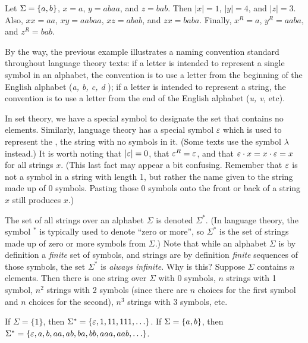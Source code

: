 \begin{example}Let $\Sigma = \mbox{$\{a,b\}$}$, $x=a$, $y=abaa$, and $z=bab$.
Then $|x| = 1$, $|y| = 4$, and $|z|=3$.  Also, $xx = aa$, $xy =
aabaa$, $xz = abab$, and $zx = baba$.  Finally, $x^R = a$,
$y^R = aaba$, and $z^R=bab$.
\end{example}

\smallskip

By the way, the previous example illustrates a naming convention standard
throughout language theory texts: if a letter is
intended to represent a single symbol in an alphabet, the convention
is to use a letter from the beginning of the English alphabet ({\em a,
b, c, d }); if a letter is intended to represent a string, the 
convention is to use a letter from the end of the English alphabet
({\em u, v, } etc).

\bigskip

In set theory, we have a special symbol to designate the set that 
contains no elements.  Similarly, language theory has a special 
symbol $\varepsilon$ which is used to represent the , the
string with no 
symbols in it.  (Some texts use the symbol $\lambda$ instead.)
It is worth noting that $|\varepsilon| = 0$, that $\varepsilon^R = \varepsilon$,
and that $\varepsilon \cdot x = x \cdot \varepsilon = x$ for all strings $x$.
(This last fact may appear a bit confusing.  Remember that $\varepsilon$
is not a symbol in a string with length 1, but rather the name given
to the string made up of 0 symbols.  Pasting those 0 symbols onto the
front or back of a string $x$ still produces $x$.) 

\bigskip

The set of all strings over an alphabet $\Sigma$ is denoted $\Sigma^*$.
(In language theory, the symbol $^*$ is typically used to denote ``zero
or more'', so $\Sigma^*$ is the set of strings made up of zero or 
more symbols from $\Sigma$.)  Note that while an alphabet 
$\Sigma$ is by 
definition a \emph{finite} set of symbols, and strings are by
definition \emph{finite} sequences of those symbols, the set $\Sigma^*$
is \emph{always infinite}.  Why is this?  Suppose $\Sigma$ contains $n$
elements.  Then there is one string over $\Sigma$ with 0 symbols,
$n$ strings with 1 symbol, $n^2$ strings with 2 symbols (since there
are $n$ choices for the first symbol and $n$ choices for the second),
$n^3$ strings with 3 symbols, etc.

\smallskip

\begin{example} If $\Sigma = \{1\}$, then $\Sigma^* = \{\varepsilon,
1, 11, 111, \ldots\}$.  If $\Sigma = \mbox{$\{a,b\}$}$, then $\Sigma^* = \{
\varepsilon, a, b, aa, ab, ba, bb, aaa, aab, \ldots\}$.
\end{example}

